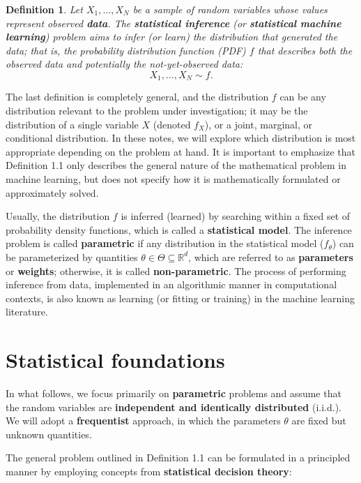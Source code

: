 \documentclass{report}
\newtheorem{definition}{Definition}[chapter]
\begin{document}
\begin{definition}
Let $X_1,\dots,X_N$ be a sample of random variables whose values represent observed \textbf{data}. The \textbf{statistical inference} (or \textbf{statistical machine learning}) problem aims to infer (or learn) the distribution that generated the data; that is, the probability distribution function (PDF) $f$ that describes both the observed data and potentially the not-yet-observed data:
\begin{equation}
X_1,\dots,X_N \sim f.
\end{equation}
\end{definition}

The last definition is completely general, and the distribution $f$ can be any distribution relevant to the problem under investigation; it may be the distribution of a single variable $X$ (denoted $f_X$), or a joint, marginal, or conditional distribution. In these notes, we will explore which distribution is most appropriate depending on the problem at hand. It is important to emphasize that Definition 1.1 only describes the general nature of the mathematical problem in machine learning, but does not specify how it is mathematically formulated or approximately solved.

Usually, the distribution $f$ is inferred (learned) by searching within a fixed set of probability density functions, which is called a \textbf{statistical model}. The inference problem is called \textbf{parametric} if any distribution in the statistical model ($f_\theta$) can be parameterized by quantities $\theta \in \Theta \subseteq \mathbb{R}^d$, which are referred to as \textbf{parameters} or \textbf{weights}; otherwise, it is called \textbf{non-parametric}. The process of performing inference from data, implemented in an algorithmic manner in computational contexts, is also known as learning (or fitting or training) in the machine learning literature.

\section{Statistical foundations}
In what follows, we focus primarily on \textbf{parametric} problems and assume that the random variables are \textbf{independent and identically distributed} (i.i.d.). We will adopt a \textbf{frequentist} approach, in which the parameters $\theta$ are fixed but unknown quantities.

The general problem outlined in Definition 1.1 can be formulated in a principled manner by employing concepts from \textbf{statistical decision theory}:
\end{document}
